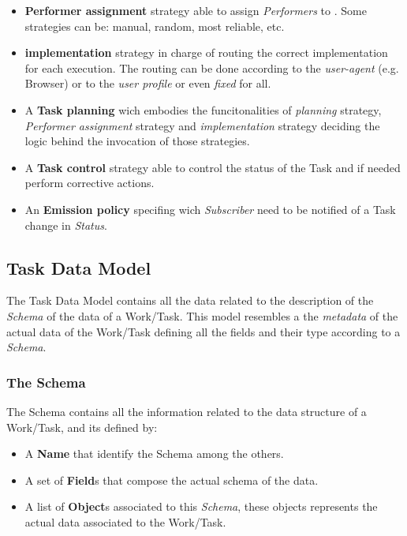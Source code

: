 \begin{itemize}
    \item \textbf{Performer assignment} strategy able to assign \emph{Performers}
    to \utask{}. Some strategies can be: manual, random, most reliable, etc.

    \item \textbf{\utask{} implementation} strategy in charge of routing the
    correct \utask{} implementation for each \utask{} execution. The routing
    can be done according to the \emph{user-agent} (e.g. Browser) or to the 
    \emph{user profile} or even \emph{fixed} for all.

    \item A \textbf{Task planning} wich embodies the funcitonalities of
    \emph{\utask{} planning} strategy, \emph{Performer assignment} strategy and
    \emph{\utask{} implementation} strategy deciding the logic behind the
    invocation of those strategies.

    \item A \textbf{Task control} strategy able to control the status of the
    Task and if needed perform corrective actions.

    \item An \textbf{Emission policy} specifing wich \emph{Subscriber} need to
    be notified of a Task change in \emph{Status}.
\end{itemize}











\subsection{Task Data Model}
The Task Data Model contains all the data related to the description of the
\emph{Schema} of the data of a Work/Task. This model resembles a the
\emph{metadata} of the actual data of the Work/Task defining all the fields
and their type according to a \emph{Schema}.


\subsubsection{The Schema}
The Schema contains all the information related to the data structure of a
Work/Task, and its defined by:
\begin{itemize}
    \item A \textbf{Name} that identify the Schema among the others.

    \item A set of \textbf{Field}s that compose the actual schema of the data. 
    
    \item A list of \textbf{Object}s associated to this \emph{Schema}, these
    objects represents the actual data associated to the Work/Task.
\end{itemize}



